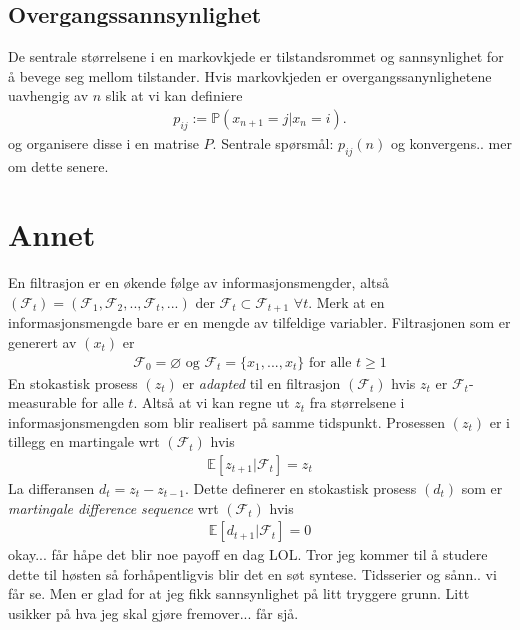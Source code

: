 \subsection{Overgangssannsynlighet}
De sentrale størrelsene i en markovkjede er tilstandsrommet og sannsynlighet for å bevege seg mellom tilstander. Hvis markovkjeden er overgangssanynlighetene uavhengig av $n$ slik at vi kan definiere
\begin{align}
p_{ij} := \mathbb{P}(x_{n+1}=j|x_n=i).
\end{align}
og organisere disse i en matrise $P$. Sentrale spørsmål: $p_{ij}(n)$ og konvergens.. mer om dette senere.
\section{Annet}
En filtrasjon er en økende følge av informasjonsmengder, altså $(\mathscr{F}_t) = (\mathscr{F}_1,\mathscr{F}_2,..,\mathscr{F}_t,...)$ der $\mathscr{F}_t \subset \mathscr{F}_{t+1}$ $\forall t$. Merk at en informasjonsmengde bare er en mengde av tilfeldige variabler. Filtrasjonen som er generert av $(x_t)$ er
\begin{align}
\mathscr{F}_0 = \varnothing \text{ og } \mathscr{F}_t = \{x_1, ..., x_t\} \text{ for alle } t \geqslant 1
\end{align}
En stokastisk prosess $(z_t)$ er \textit{adapted} til en filtrasjon $(\mathscr{F}_t)$ hvis $z_t$ er $\mathscr{F}_t$-measurable for alle $t$. Altså at vi kan regne ut $z_t$ fra størrelsene i informasjonsmengden som blir realisert på samme tidspunkt. Prosessen $(z_t)$ er i tillegg en martingale wrt $(\mathscr{F}_t)$ hvis 
\begin{align}
\mathbb{E}[z_{t+1}|\mathscr{F}_t]=z_t
\end{align}
La differansen $d_t = z_t-z_{t-1}$. Dette definerer en stokastisk prosess $(d_t)$ som er \textit{martingale difference sequence} wrt $(\mathscr{F}_t)$ hvis
\begin{align}
\mathbb{E}[d_{t+1}|\mathscr{F}_t]=0
\end{align}
okay... får håpe det blir noe payoff en dag LOL. Tror jeg kommer til å studere dette til høsten så forhåpentligvis blir det en søt syntese. Tidsserier og sånn.. vi får se. Men er glad for at jeg fikk sannsynlighet på litt tryggere grunn. Litt usikker på hva jeg skal gjøre fremover... får sjå.
